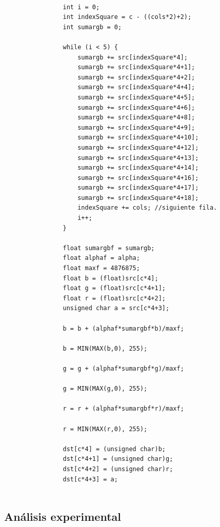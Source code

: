 \begin{codesnippet}
\begin{verbatim}
                
                int i = 0;
                int indexSquare = c - ((cols*2)+2);
                int sumargb = 0;
                
                while (i < 5) {
                    sumargb += src[indexSquare*4];
                    sumargb += src[indexSquare*4+1];
                    sumargb += src[indexSquare*4+2];
                    sumargb += src[indexSquare*4+4];
                    sumargb += src[indexSquare*4+5];
                    sumargb += src[indexSquare*4+6];
                    sumargb += src[indexSquare*4+8];
                    sumargb += src[indexSquare*4+9];
                    sumargb += src[indexSquare*4+10];
                    sumargb += src[indexSquare*4+12];
                    sumargb += src[indexSquare*4+13];
                    sumargb += src[indexSquare*4+14];
                    sumargb += src[indexSquare*4+16];
                    sumargb += src[indexSquare*4+17];
                    sumargb += src[indexSquare*4+18];
                    indexSquare += cols; //siguiente fila.
                    i++;
                }

                float sumargbf = sumargb;
                float alphaf = alpha;
                float maxf = 4876875;
                float b = (float)src[c*4];
                float g = (float)src[c*4+1];
                float r = (float)src[c*4+2];
                unsigned char a = src[c*4+3];

                b = b + (alphaf*sumargbf*b)/maxf;

                b = MIN(MAX(b,0), 255);

                g = g + (alphaf*sumargbf*g)/maxf;

                g = MIN(MAX(g,0), 255);

                r = r + (alphaf*sumargbf*r)/maxf;

                r = MIN(MAX(r,0), 255);

                dst[c*4] = (unsigned char)b;
                dst[c*4+1] = (unsigned char)g;
                dst[c*4+2] = (unsigned char)r;
                dst[c*4+3] = a;
                
\end{verbatim}
\end{codesnippet}

\subsection{Análisis experimental}

